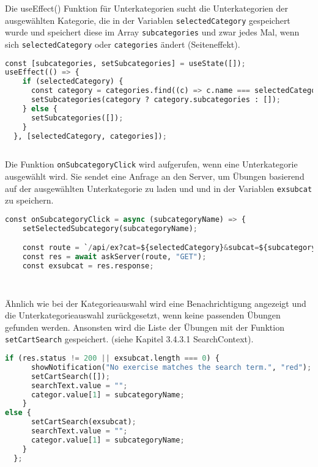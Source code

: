Die useEffect() Funktion für Unterkategorien sucht die Unterkategorien der ausgewählten Kategorie, die in der Variablen \texttt{selectedCategory} gespeichert wurde und speichert diese im Array \texttt{subcategories} und zwar jedes Mal, wenn sich \texttt{selectedCategory} oder \texttt{categories} ändert (Seiteneffekt). 


\begin{lstlisting}[language=Python]
const [subcategories, setSubcategories] = useState([]);
useEffect(() => {
    if (selectedCategory) {
      const category = categories.find((c) => c.name === selectedCategory);
      setSubcategories(category ? category.subcategories : []);
    } else {
      setSubcategories([]);
    }
  }, [selectedCategory, categories]);
      
\end{lstlisting}



Die Funktion \texttt{onSubcategoryClick} wird aufgerufen, wenn eine Unterkategorie ausgewählt wird. Sie sendet eine Anfrage an den Server, um Übungen basierend auf der ausgewählten Unterkategorie zu laden und und in der Variablen \texttt{exsubcat} zu speichern.

\begin{lstlisting}[language=Python]
const onSubcategoryClick = async (subcategoryName) => {
    setSelectedSubcategory(subcategoryName);

    const route = `/api/ex?cat=${selectedCategory}&subcat=${subcategoryName}`;
    const res = await askServer(route, "GET");
    const exsubcat = res.response;
    
    
\end{lstlisting}

 Ähnlich wie bei der Kategorieauswahl wird eine Benachrichtigung angezeigt und die Unterkategorieauswahl zurückgesetzt, wenn keine passenden Übungen gefunden werden. Ansonsten wird die Liste der Übungen mit der Funktion \texttt{setCartSearch} gespeichert. (siehe Kapitel 3.4.3.1 SearchContext).


\begin{lstlisting}[language=Python]
if (res.status != 200 || exsubcat.length === 0) {
      showNotification("No exercise matches the search term.", "red");
      setCartSearch([]);
      searchText.value = "";
      categor.value[1] = subcategoryName;
    }
else {
      setCartSearch(exsubcat);
      searchText.value = "";
      categor.value[1] = subcategoryName;
    }
  };
\end{lstlisting}